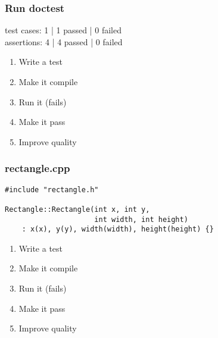 \begin{frame}[fragile]
\frametitle{Run doctest}
\begin{minipage}[t]{0.48\linewidth}
test cases: 1 | 1 passed | 0 failed\\
assertions: 4 | 4 passed | 0 failed\\
\end{minipage}\hfill
\begin{minipage}[t]{0.28\linewidth}
  \small
  \begin{enumerate} 
    \item \textcolor{deadcolor}{Write a test}
    \item \textcolor{deadcolor}{Make it compile}
    \item \textcolor{deadcolor}{Run it (fails)}
    \item \textcolor{activecolor}{Make it pass}
    \item \textcolor{deadcolor}{Improve quality}
  \end{enumerate} 
\end{minipage}
\end{frame}


\begin{frame}[fragile]
\frametitle{rectangle.cpp}
\begin{minipage}[t]{0.48\linewidth}
\begin{lstlisting}
#include "rectangle.h"

Rectangle::Rectangle(int x, int y, 
                     int width, int height)
    : x(x), y(y), width(width), height(height) {}

\end{lstlisting}
\end{minipage}\hfill
\begin{minipage}[t]{0.28\linewidth}
  \small
  \begin{enumerate} 
    \item \textcolor{deadcolor}{Write a test}
    \item \textcolor{deadcolor}{Make it compile}
    \item \textcolor{deadcolor}{Run it (fails)}
    \item \textcolor{deadcolor}{Make it pass}
    \item \textcolor{activecolor}{Improve quality}
  \end{enumerate} 
\end{minipage}
\end{frame}



